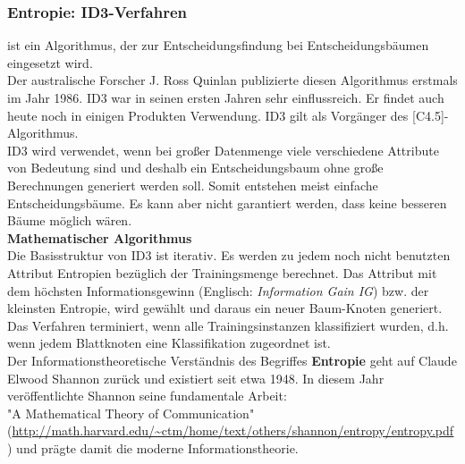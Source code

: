 \documentclass[12pt]{article}
\begin{document}
\subsubsection{Entropie: ID3-Verfahren}
%
{\color{blue}{Iterative Dichotomiser3 (ID3)}}  ist ein Algorithmus, der zur Entscheidungsfindung bei Entscheidungsbäumen eingesetzt wird.\\
Der australische Forscher J. Ross Quinlan publizierte diesen Algorithmus erstmals im Jahr 1986. ID3 war in seinen ersten Jahren sehr einflussreich. Er findet auch heute noch in einigen Produkten Verwendung. ID3 gilt als Vorgänger des [C4.5]-Algorithmus.\\
%
ID3 wird verwendet, wenn bei großer Datenmenge viele verschiedene Attribute von Bedeutung sind und deshalb ein Entscheidungsbaum ohne große Berechnungen generiert werden soll. Somit entstehen meist einfache Entscheidungsbäume. Es kann aber nicht garantiert werden, dass keine besseren Bäume möglich wären.\\[0.2cm]
%
\textbf{Mathematischer Algorithmus} \\[0.2cm]
Die Basisstruktur von ID3 ist iterativ. Es werden zu jedem noch nicht benutzten Attribut Entropien bezüglich der Trainingsmenge berechnet. Das Attribut mit dem höchsten Informationsgewinn (Englisch: \textit{Information Gain IG}) bzw. der kleinsten Entropie, wird gewählt und daraus ein neuer Baum-Knoten generiert.\\[0.1cm]
Das Verfahren terminiert, wenn alle Trainingsinstanzen klassifiziert wurden, d.h. wenn jedem Blattknoten eine Klassifikation zugeordnet ist.\\[0.1cm]
Der Informationstheoretische Verständnis des Begriffes \textbf {Entropie} geht auf Claude Elwood Shannon zurück und existiert seit etwa 1948. In diesem Jahr veröffentlichte Shannon seine fundamentale Arbeit:\\
 "A Mathematical Theory of Communication" (\url{http://math.harvard.edu/~ctm/home/text/others/shannon/entropy/entropy.pdf}) und prägte damit die moderne Informationstheorie.\\
 
\end{document}
